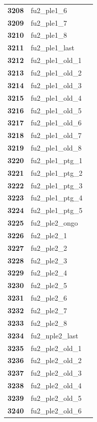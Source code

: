 \documentclass[
  letterpaper,
  DIV=11,
  numbers=noendperiod]{scrartcl}
\begin{document}
\begin{longtable}[t]{>{}cll}
\textbf{3208} & fu2\_ple1\_6 & \\
\textbf{3209} & fu2\_ple1\_7 & \\
\textbf{3210} & fu2\_ple1\_8 & \\
\addlinespace
\textbf{3211} & fu2\_ple1\_last & \\
\textbf{3212} & fu2\_ple1\_old\_1 & \\
\textbf{3213} & fu2\_ple1\_old\_2 & \\
\textbf{3214} & fu2\_ple1\_old\_3 & \\
\textbf{3215} & fu2\_ple1\_old\_4 & \\
\addlinespace
\textbf{3216} & fu2\_ple1\_old\_5 & \\
\textbf{3217} & fu2\_ple1\_old\_6 & \\
\textbf{3218} & fu2\_ple1\_old\_7 & \\
\textbf{3219} & fu2\_ple1\_old\_8 & \\
\textbf{3220} & fu2\_ple1\_ptg\_1 & \\
\addlinespace
\textbf{3221} & fu2\_ple1\_ptg\_2 & \\
\textbf{3222} & fu2\_ple1\_ptg\_3 & \\
\textbf{3223} & fu2\_ple1\_ptg\_4 & \\
\textbf{3224} & fu2\_ple1\_ptg\_5 & \\
\textbf{3225} & fu2\_ple2\_ongo & \\
\addlinespace
\textbf{3226} & fu2\_ple2\_1 & \\
\textbf{3227} & fu2\_ple2\_2 & \\
\textbf{3228} & fu2\_ple2\_3 & \\
\textbf{3229} & fu2\_ple2\_4 & \\
\textbf{3230} & fu2\_ple2\_5 & \\
\addlinespace
\textbf{3231} & fu2\_ple2\_6 & \\
\textbf{3232} & fu2\_ple2\_7 & \\
\textbf{3233} & fu2\_ple2\_8 & \\
\textbf{3234} & fu2\_nple2\_last & \\
\textbf{3235} & fu2\_ple2\_old\_1 & \\
\addlinespace
\textbf{3236} & fu2\_ple2\_old\_2 & \\
\textbf{3237} & fu2\_ple2\_old\_3 & \\
\textbf{3238} & fu2\_ple2\_old\_4 & \\
\textbf{3239} & fu2\_ple2\_old\_5 & \\
\textbf{3240} & fu2\_ple2\_old\_6 & \\

\end{longtable}
\end{document}
